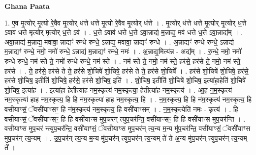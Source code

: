 \documentclass[17pt]{extarticle}
\begin{document}
\textbf{Ghana Paata } \newline

1. ए॒व मृ॒त्योर् मृ॒त्यो रे॒वैव मृ॒त्योर् ध॑त्ते धत्ते मृ॒त्यो रे॒वैव मृ॒त्योर् ध॑त्ते । . मृ॒त्योर् ध॑त्ते धत्ते मृ॒त्योर् मृ॒त्योर् ध॒त्ते ऽवाव॑ धत्ते मृ॒त्योर् मृ॒त्योर् ध॒त्ते ऽव॑ । . ध॒त्ते ऽवाव॑ धत्ते ध॒त्ते ऽवा॒न्नाद्य॑ म॒न्नाद्य॒ मव॑ धत्ते ध॒त्ते ऽवा॒न्नाद्य᳚म् । . अवा॒न्नाद्य॑ म॒न्नाद्य॒ मवावा॒ न्नाद्यꣳ॑ रुन्धे रुन्धे॒ ऽन्नाद्य॒ मवावा॒ न्नाद्यꣳ॑ रुन्धे । . अ॒न्नाद्यꣳ॑ रुन्धे रुन्धे॒ ऽन्नाद्य॑ म॒न्नाद्यꣳ॑ रुन्धे॒ नमो॒ नमो॑ रुन्धे॒ ऽन्नाद्य॑ म॒न्नाद्यꣳ॑ रुन्धे॒ नमः॑ । . अ॒न्नाद्य॒मित्य॑न्न - अद्य᳚म् । . रु॒न्धे॒ नमो॒ नमो॑ रुन्धे रुन्धे॒ नम॑ स्ते ते॒ नमो॑ रुन्धे रुन्धे॒ नम॑ स्ते । . नम॑ स्ते ते॒ नमो॒ नम॑ स्ते॒ हर॑से॒ हर॑से ते॒ नमो॒ नम॑ स्ते॒ हर॑से । . ते॒ हर॑से॒ हर॑से ते ते॒ हर॑से शो॒चिषे॑ शो॒चिषे॒ हर॑से ते ते॒ हर॑से शो॒चिषे᳚ । . हर॑से शो॒चिषे॑ शो॒चिषे॒ हर॑से॒ हर॑से शो॒चिष॒ इतीति॑ शो॒चिषे॒ हर॑से॒ हर॑से शो॒चिष॒ इति॑ । . शो॒चिष॒ इतीति॑ शो॒चिषे॑ शो॒चिष॒ इत्या॑हा॒हेति॑ शो॒चिषे॑ शो॒चिष॒ इत्या॑ह । . इत्या॑हा॒ हेतीत्या॑ह नम॒स्कृत्य॑ नम॒स्कृत्या॒ हेतीत्या॑ह नम॒स्कृत्य॑ । . आ॒ह॒ न॒म॒स्कृत्य॑ नम॒स्कृत्या॑ हाह नम॒स्कृत्य॒ हि हि न॑म॒स्कृत्या॑ हाह नम॒स्कृत्य॒ हि । . न॒म॒स्कृत्य॒ हि हि न॑म॒स्कृत्य॑ नम॒स्कृत्य॒ हि वसी॑याꣳसं॒ ॅवसी॑याꣳसꣳ॒॒ हि न॑म॒स्कृत्य॑ नम॒स्कृत्य॒ हि वसी॑याꣳसम् । . न॒म॒स्कृत्येति॑ नमः - कृत्य॑ । . हि वसी॑याꣳसं॒ ॅवसी॑याꣳसꣳ॒॒ हि हि वसी॑याꣳस मुप॒चर॑न् त्युप॒चर॑न्ति॒ वसी॑याꣳसꣳ॒॒ हि हि वसी॑याꣳस मुप॒चर॑न्ति । . वसी॑याꣳस मुप॒चर॑ न्त्युप॒चर॑न्ति॒ वसी॑याꣳसं॒ ॅवसी॑याꣳस मुप॒चर॑न् त्य॒न्य म॒न्य मु॑प॒चर॑न्ति॒ वसी॑याꣳसं॒ ॅवसी॑याꣳस मुप॒चर॑न् त्य॒न्यम् । . उ॒प॒चर॑न् त्य॒न्य म॒न्य मु॑प॒चर॑न् त्युप॒चर॑न् त्य॒न्यम् ते॑ ते अ॒न्य मु॑प॒चर॑न् त्युप॒चर॑न् त्य॒न्यम् ते᳚ । \newline
\end{document}
